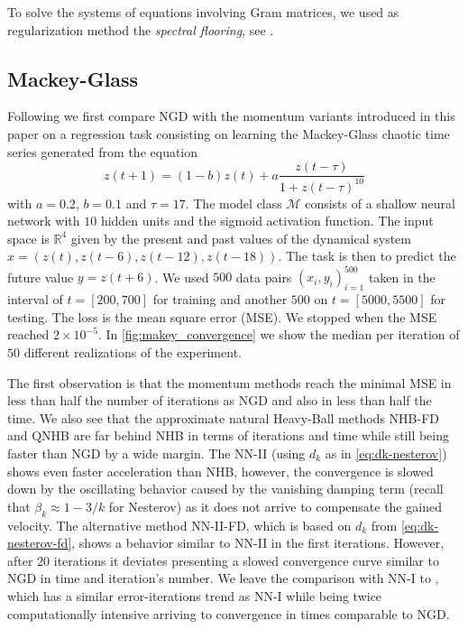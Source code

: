 \documentclass{article}
\theoremstyle{noparens}
\newcommand{\cM}{\mathcal{M}}
\newcommand{\R}{\mathbb{R}}
\begin{document}
To solve the systems of equations involving  Gram  matrices, we used as regularization method the \textit{spectral flooring}, see .






\subsection{Mackey-Glass}
Following \cite{parkAdaptiveNaturalGradient2000}  we first compare NGD with the momentum variants introduced in this paper on a regression task consisting on learning the Mackey-Glass chaotic time series generated from the equation
$$z(t+1)=(1-b)z(t)+a\frac{z(t-\tau)}{1+z(t-\tau)^{10}}$$
with $a=0.2$, $b=0.1$ and $\tau=17$. The model class $\cM$ consists of a shallow neural network with $10$ hidden units and the sigmoid activation function. The input space is $\R^4$ given by the present and past values of the dynamical system $x=(z(t), z(t-6), z(t-12), z(t-18))$. The task is then to predict the future value $y=z(t+6)$. We used $500$ data pairs $(x_i, y_i)_{i=1}^{500}$ taken in the interval of $t=[200, 700]$ for training and another $500$ on $t=[5000, 5500]$ for testing. The loss is the mean square error (MSE). We stopped when the MSE reached $2\times10^{-5}$. In \cref{fig:makey_convergence} we show the median per iteration of $50$ different realizations of the experiment.

The first observation is that the momentum methods reach the minimal MSE in less than half the number of iterations as NGD and also in less than half the time. We also see that the approximate natural Heavy-Ball methods NHB-FD and QNHB are far behind NHB in terms of iterations and time while still being faster than NGD by a wide margin. The NN-II (using $d_k$ as in \eqref{eq:dk-nesterov}) shows even faster acceleration than NHB, however, the convergence is slowed down by the oscillating behavior caused by the vanishing damping term (recall that $\beta_k \approx 1-3/k$ for Nesterov) as it does not arrive to compensate the gained velocity. The alternative method NN-II-FD, which is based on $d_k$ from \eqref{eq:dk-nesterov-fd}, shows a behavior similar to NN-II in the first iterations. However, after $20$ iterations it deviates presenting a slowed convergence curve similar to NGD in time and iteration's number. We leave the comparison with NN-I to , which has a similar error-iterations trend as NN-I while being twice computationally intensive arriving to convergence in times comparable to NGD.
\end{document}
